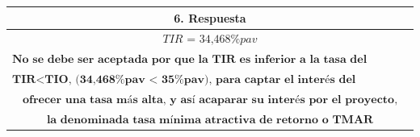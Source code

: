 \begin{center}
\begin{longtable}{|c|c|c|}
        \multicolumn{3}{|c|}{\cellcolor[HTML]{FFB183}\textbf{6. Respuesta}}                                                                                                                                                           \\
        \hline
        \multicolumn{3}{|c|}{$\textit{TIR = 34,468\% pav}$}                                                                                                                                                                           \\
        \multicolumn{3}{|c|}{$\textbf{No se debe ser aceptada por que la TIR es inferior a la tasa del inversionista,}$}                                                                                                              \\
        \multicolumn{3}{|c|}{$\textbf{TIR<TIO, (34,468\% pav < 35\% pav), para captar el interés del inversionista hay que }$}                                                                                                        \\
        \multicolumn{3}{|c|}{$\textbf{ofrecer una tasa más alta, y así acaparar su interés por el proyecto,}$}                                                                                                                        \\
        \multicolumn{3}{|c|}{$\textbf{la denominada tasa mínima atractiva de retorno o TMAR}$}                                                                                                                                        \\
        \hline
    \end{longtable}
\end{center}

